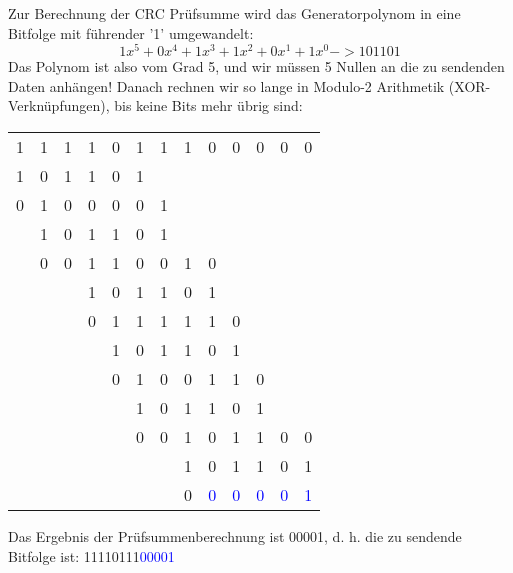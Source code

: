 
Zur Berechnung der CRC Prüfsumme wird das Generatorpolynom in eine Bitfolge mit führender '1' umgewandelt:
\[1x^5 + 0x^4 + 1x^3 + 1x^2 + 0x^1 + 1x^0 ->  101101\]
Das Polynom ist also vom Grad 5, und wir müssen 5 Nullen an die zu sendenden Daten anhängen!
Danach rechnen wir so lange in Modulo-2 Arithmetik (XOR-Verknüpfungen), bis keine Bits mehr übrig sind:

\begin{center}
    \begin{tabular}{c c c c c c c c c c c c c}
        1 & 1 & 1 & 1 & 0 & 1 & 1 & 1 & 0 & 0 & 0 & 0 & 0 \tabularnewline
        1 & 0 & 1 & 1 & 0 & 1 & & & & & & & \tabularnewline
        \hline
        0 & 1 & 0 & 0 & 0 & 0 & 1 & & & & & & \tabularnewline
        & 1 & 0 & 1 & 1 & 0 & 1 & & & & & & \tabularnewline
        \hline
        & 0 & 0 & 1 & 1 & 0 & 0 & 1 & 0 & & & & \tabularnewline
        & & & 1 & 0 & 1 & 1 & 0 & 1 & & & & \tabularnewline
        \hline
        & & & 0 & 1 & 1 & 1 & 1 & 1 & 0 & & & \tabularnewline
        & & & & 1 & 0 & 1 & 1 & 0 & 1 & & & \tabularnewline
        \hline
        & & & & 0 & 1 & 0 & 0 & 1 & 1 & 0 & & \tabularnewline
        & & & & & 1 & 0 & 1 & 1 & 0 & 1 & & \tabularnewline
        \hline
        & & & & & 0 & 0 & 1 & 0 & 1 & 1 & 0 & 0 \tabularnewline
        & & & & & & & 1 & 0 & 1 & 1 & 0 & 1 \tabularnewline
        \hline
        & & & & & & & 0 & \textcolor{blue}{0} & \textcolor{blue}{0} & \textcolor{blue}{0} & \textcolor{blue}{0} & \textcolor{blue}{1} \tabularnewline
    \end{tabular}
\end{center}

Das Ergebnis der Prüfsummenberechnung ist 00001,
d. h. die zu sendende Bitfolge ist: 11110111\textcolor{blue}{00001}